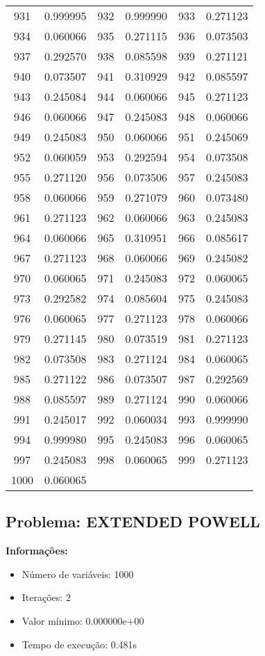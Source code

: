\documentclass[12pt]{article}
\begin{document}
\begin{longtable}{@{}cc|cc|cc@{}}
931 & 0.999995 & 932 & 0.999990 & 933 & 0.271123 \\
934 & 0.060066 & 935 & 0.271115 & 936 & 0.073503 \\
937 & 0.292570 & 938 & 0.085598 & 939 & 0.271121 \\
940 & 0.073507 & 941 & 0.310929 & 942 & 0.085597 \\
943 & 0.245084 & 944 & 0.060066 & 945 & 0.271123 \\
946 & 0.060066 & 947 & 0.245083 & 948 & 0.060066 \\
949 & 0.245083 & 950 & 0.060066 & 951 & 0.245069 \\
952 & 0.060059 & 953 & 0.292594 & 954 & 0.073508 \\
955 & 0.271120 & 956 & 0.073506 & 957 & 0.245083 \\
958 & 0.060066 & 959 & 0.271079 & 960 & 0.073480 \\
961 & 0.271123 & 962 & 0.060066 & 963 & 0.245083 \\
964 & 0.060066 & 965 & 0.310951 & 966 & 0.085617 \\
967 & 0.271123 & 968 & 0.060066 & 969 & 0.245082 \\
970 & 0.060065 & 971 & 0.245083 & 972 & 0.060065 \\
973 & 0.292582 & 974 & 0.085604 & 975 & 0.245083 \\
976 & 0.060065 & 977 & 0.271123 & 978 & 0.060066 \\
979 & 0.271145 & 980 & 0.073519 & 981 & 0.271123 \\
982 & 0.073508 & 983 & 0.271124 & 984 & 0.060065 \\
985 & 0.271122 & 986 & 0.073507 & 987 & 0.292569 \\
988 & 0.085597 & 989 & 0.271124 & 990 & 0.060066 \\
991 & 0.245017 & 992 & 0.060034 & 993 & 0.999990 \\
994 & 0.999980 & 995 & 0.245083 & 996 & 0.060065 \\
997 & 0.245083 & 998 & 0.060065 & 999 & 0.271123 \\
1000 & 0.060065 &  &  &  &  \\

\end{longtable}


\newpage            
\subsection{Problema: EXTENDED POWELL}

\textbf{Informações:}
\begin{itemize}
\item Número de variáveis: 1000
\item Iterações: 2
\item Valor mínimo: 0.000000e+00
\item Tempo de execução: 0.481s
\end{itemize}
\end{document}
